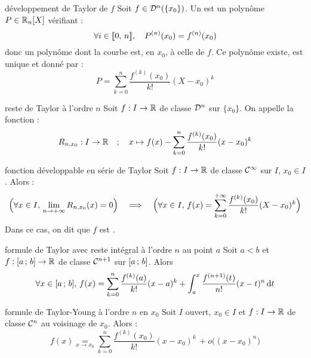 

\begin{adjustwidth}{-3cm}{-3cm}


\begin{definition}{25.13}{développement de Taylor de $f$}
Soit $f \in \mathcal{D}^{n}(\{x_0\})$. Un  est un polynôme $P \in \mathbb{R}_n[X]$ vérifiant :
$$ \forall i \in \llbracket 0 ,\, n \rrbracket, \quad P^{(n)}(x_0) = f^{(n)}(x_0) $$
donc un polynôme dont la courbe est, en $x_0$,  à celle de $f$. Ce polynôme existe, est unique et donné par : 
$$P = \sum_{k=0}^{n}\frac{f^{(k)}(x_0)}{k!}(X-x_0)^k$$
\end{definition}

\begin{definition}{25.16}{reste de Taylor à l'ordre $n$}
    Soit $f:I \to \mathbb{R}$ de classe $\mathcal{D}^{n}$ sur $\{x_0\}$. On appelle  la fonction : 
    $$R_{n,x_0} : I \to \mathbb{R} \quad ; \quad x \mapsto f(x) - \sum_{k=0}^{n}\frac{f^{(k)}(x_0)}{k!}(x-x_0)^k$$
\end{definition}

\begin{proposition}{25.18}{fonction développable en série de Taylor}
    Soit $f:I \to \mathbb{R}$ de classe $\mathcal{C}^{\infty}$ sur $I$, $x_0 \in I$. Alors : 
    $$\Bigr(\forall x \in I, \, \lim_{n \to +\infty} R_{n,x_0}(x) = 0\Bigl) \quad \implies \quad \Bigr(\forall x \in I, \, f(x) = \sum_{k=0}^{+\infty}\frac{f^{(k)}(x_0)}{k!}(X-x_0)^k\Bigl)$$
    Dans ce cas, on dit que $f$ est .
\end{proposition}

\begin{theoreme}{25.20}{formule de Taylor avec reste intégral à l'ordre $n$ au point $a$}
    Soit $a<b$ et $f:[a\, ; \, b] \to \mathbb{R}$ de classe $\mathcal{C}^{n+1}$ sur $[a\, ; \, b]$. Alors
    $$\forall x \in [a\, ; \, b],\, f(x) = \sum_{k=0}^{n}\frac{f^{(k)}(a)}{k!}(x-a)^k + \int_{a}^{x} \frac{f^{(n+1)}(t)}{n!}(x-t)^n\, \text{d}t $$

\end{theoreme}

\begin{theoreme}{25.27}{formule de Taylor-Young à l'ordre $n$ en $x_0$}
    Soit $I$ ouvert, $x_0 \in I$ et $f:I \to \mathbb{R}$ de classe $\mathcal{C}^{n}$ au voisinage de $x_0$. Alors : 
    $$f(x) \underset{x \to x_0}{=} \sum_{k=0}^{n}\frac{f^{(k)}(x_0)}{k!}(x-x_0)^k \, + o\bigl((x-x_0)^n\bigr)$$
\end{theoreme}


\end{adjustwidth}
